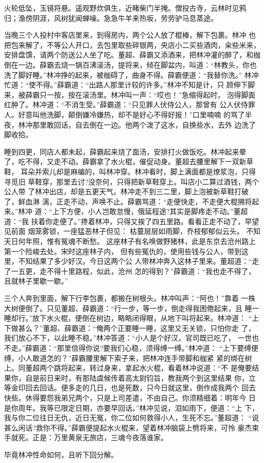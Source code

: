 火轮低坠，玉镜将悬。遥观野炊俱生，近睹柴门半掩。僧投古寺，云林时见鸦
归；渔傍阴涯，风树犹闻蝉噪。急急牛羊来热坂，劳劳驴马息蒸途。

当晚三个人投村中客店里来，到得房内，两个公人放了棍棒，解下包裹。林冲
也把包来解了，不等公人开口，去包里取些碎银两，央店小二买些酒肉，籴些米来，
安排盘馔，请两个防送公人坐了吃。董超、薛霸又添酒来，把林冲灌的醉了，和枷
倒在一边。薛霸去烧一锅百沸滚汤，提将来，倾在脚盆内，叫道：“林教头，你也
洗了脚好睡。”林冲挣的起来，被枷碍了，曲身不得。薛霸便道：“我替你洗。”
林冲忙道：“使不得。”薛霸道：“出路人那里计较的许多。”林冲不知是计，只
顾伸下脚来，被薛霸只一按，按在滚汤里。林冲叫一声：“哎也！”急缩得起时，
泡得脚面红肿了。林冲道：“不消生受。”薛霸道：“只见罪人伏侍公人，那曾有
公人伏侍罪人。好意叫他洗脚，颠倒嫌冷嫌热，却不是好心不得好报！”口里喃喃
的骂了半夜，林冲那里敢回话，自去倒在一边。他两个泼了这水，自换些水，去外
边洗了脚收拾。

睡到四更，同店人都未起，薛霸起来烧了面汤，安排打火做饭吃。林冲起来晕
了，吃不得，又走不动。薛霸拿了水火棍，催促动身。董超去腰里解下一双新草鞋，
耳朵并索儿却是麻编的，叫林冲穿。林冲看时，脚上满面都是燎浆泡，只得寻觅旧
草鞋穿，那里去讨?没奈何，只得把新草鞋穿上。叫店小二算过酒钱，两个公人带
了林冲出店，却是五更天气。林冲走不到三二里，脚上泡被新草鞋打破了，鲜血淋
漓，正走不动，声唤不止。薛霸骂道：“走便快走，不走便大棍搠将起来。”林冲
道：“上下方便，小人岂敢怠慢，俄延程途?其实是脚疼走不动。”董超道：“我
扶着你走便了。”搀着林冲，只得又挨了四五里路。看看正走不动了，早望见前面
烟笼雾锁，一座猛恶林子但见：
枯蔓层层如雨脚，乔枝郁郁似云头。
不知天日何年照，惟有冤魂不断愁。
这座林子有名唤做野猪林，此是东京去沧州路上第一个险峻去处。宋时这座林子内，
但有些冤仇的，使用些钱与公人，带到这里，不知结果了多少好汉。今日这两个公
人带林冲奔入这林子里来。董超道：“走了一五更，走不得十里路程，似此，沧州
怎的得到？”薛霸道：“我也走不得了，且就林子里歇一歇。”

三个人奔到里面，解下行李包裹，都搬在树根头。林冲叫声：“阿也！”靠着
一株大树便倒了。只见董超、薛霸道：“行一步，等一步，倒走得我困倦起来，且
睡一睡却行。”放下水火棍，便倒在树边，略略闭得眼，从地下叫将起来。林冲道：
“上下做甚么？”董超、薛霸道：“俺两个正要睡一睡，这里又无关锁，只怕你走
了，我们放心不下，以此睡不稳。”林冲答道：“小人是个好汉，官司既已吃了，
一世也不走。”薛霸道：“那里信得你说?要我们心稳，须得缚一缚。”林冲道：
“上下要缚便缚，小人敢道怎的？”薛霸腰里解下索子来，把林冲连手带脚和枷紧
紧的绑在树上。同董超两个跳将起来，转过身来，拿起水火棍，看着林冲说道：“不
是俺要结果你，自是前日来时，有那陆虞候传着高太尉钧旨，教我两个到这里结果
你，立等金印回去回话。便多走的几日，也是死数，只今日就这里，倒作成我两个
回去快些。休得要怨我弟兄两个，只是上司差遣，不由自己。你须精细着：明年今
日是你周年。我等已限定日期，亦要早回话。”林冲见说，泪如雨下，便道：“上
下，我与你二位往日无仇，近日无冤，你二位如何救得小人，生死不忘。”董超道：
“说甚么闲话?救你不得。”薛霸便提起水火棍来，望着林冲脑袋上劈将来，可怜
豪杰束手就死。正是：万里黄泉无旅店，三魂今夜落谁家。

毕竟林冲性命如何，且听下回分解。